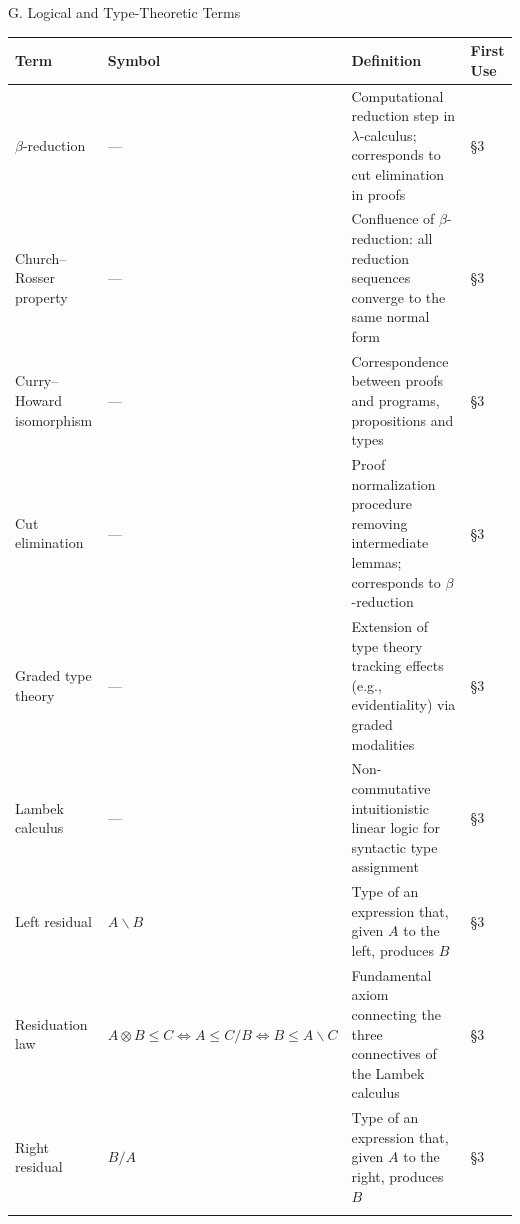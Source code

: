 \documentclass[
  ignorenonframetext,
]{beamer}
\newcounter{none} %
\begin{document}
\begin{frame}{G. Logical and Type-Theoretic Terms}
\protect{}\label{g.-logical-and-type-theoretic-terms}
{\def\LTcaptype{none} %
\begin{longtable}[]{@{}
  >{\raggedright\arraybackslash}p{}
  >{\centering\arraybackslash}p{}
  >{\raggedright\arraybackslash}p{}
  >{\centering\arraybackslash}p{}@{}}
\toprule\noalign{}
\begin{minipage}[b]{\linewidth}\raggedright
Term
\end{minipage} & \begin{minipage}[b]{\linewidth}\centering
Symbol
\end{minipage} & \begin{minipage}[b]{\linewidth}\raggedright
Definition
\end{minipage} & \begin{minipage}[b]{\linewidth}\centering
First Use
\end{minipage} \\
\midrule\noalign{}
\endhead
\(\beta\)-reduction & --- & Computational reduction step in
\(\lambda\)-calculus; corresponds to cut elimination in proofs & §3 \\
Church--Rosser property & --- & Confluence of \(\beta\)-reduction: all
reduction sequences converge to the same normal form & §3 \\
Curry--Howard isomorphism & --- & Correspondence between proofs and
programs, propositions and types & §3 \\
Cut elimination & --- & Proof normalization procedure removing
intermediate lemmas; corresponds to \(\beta\)-reduction & §3 \\
Graded type theory & --- & Extension of type theory tracking effects
(e.g., evidentiality) via graded modalities & §3 \\
Lambek calculus & --- & Non-commutative intuitionistic linear logic for
syntactic type assignment & §3 \\
Left residual & \(A \backslash B\) & Type of an expression that, given
\(A\) to the left, produces \(B\) & §3 \\
Residuation law &
\(A \otimes B \leq C \iff A \leq C / B \iff B \leq A \backslash C\) &
Fundamental axiom connecting the three connectives of the Lambek
calculus & §3 \\
Right residual & \(B / A\) & Type of an expression that, given \(A\) to
the right, produces \(B\) & §3 \\
\bottomrule\noalign{}
\end{longtable}
}
\end{frame}
\end{document}
